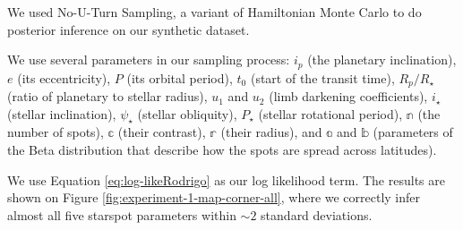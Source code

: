 \documentclass[twocolumn]{aastex631}
\newcommand{\sabinasays}[1]{{\color{purple}#1}}
\begin{document}
We used No-U-Turn Sampling, a variant of Hamiltonian Monte Carlo \citep[NUTS;][]{Duane1987,Hoffman2011} to do posterior inference on our synthetic dataset.

We use several parameters in our sampling process: $i_p$ (the planetary inclination), $e$ (its eccentricity), $P$ (its orbital period),
$t_0$ (start of the transit time), $R_p/R_\star$ (ratio of planetary to stellar radius), $u_1$ and $u_2$ (limb darkening coefficients),
$i_\star$ (stellar inclination), $\psi_\star$ (stellar obliquity), $P_\star$ (stellar rotational period), $\mathbb{n}$ (the number of spots), 
$\mathbb{c}$ (their contrast), $\mathbb{r}$ (their radius), and $\mathbb{a}$ and $\mathbb{b}$ (parameters of the Beta distribution that describe 
how the spots are spread across latitudes).  

We use Equation \ref{eq:log-likeRodrigo} as our log likelihood term. The results
are shown on Figure \ref{fig:experiment-1-map-corner-all}, where we correctly
infer almost all five \sabinasays{starspot} parameters within $\sim 2$ standard deviations. 
\end{document}
